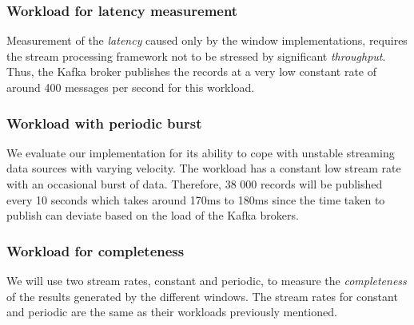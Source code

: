 \subsubsection{Workload for latency measurement}
Measurement of the \emph{latency} caused only 
by the window implementations, requires the stream processing framework not to be 
stressed by significant \emph{throughput}. Thus, the Kafka broker 
publishes the records at a very low constant rate of around 400 messages per second for 
this workload. 

\subsubsection{Workload with periodic burst}
We evaluate our implementation for its ability to cope with unstable 
streaming data sources with varying velocity.
The workload has a constant low stream rate with an occasional 
burst of data. Therefore, 38 000 records will be published every 10 seconds which 
takes around 170ms to 180ms since the time taken to publish can deviate based on the 
load of the Kafka brokers. 

\subsubsection{Workload for completeness}
We will use two stream rates, constant and periodic, 
to measure the \emph{completeness} of the results generated 
by the different windows. The stream rates for constant and periodic are the same as their 
workloads previously mentioned. 






